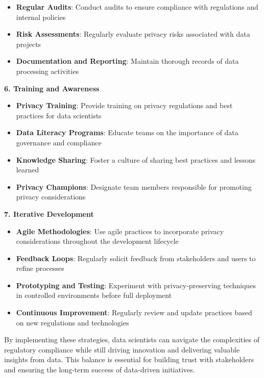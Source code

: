 \documentclass[12pt]{article}
\begin{document}
\begin{enumerate}
\begin{tcolorbox}[colback=blue!5!white,colframe=blue!75!black,title={Solution}]
\begin{itemize}
        \item \textbf{Regular Audits}: Conduct audits to ensure compliance with regulations and internal policies
        \item \textbf{Risk Assessments}: Regularly evaluate privacy risks associated with data projects
        \item \textbf{Documentation and Reporting}: Maintain thorough records of data processing activities
    \end{itemize}
    \textbf{6. Training and Awareness}
    \begin{itemize}
        \item \textbf{Privacy Training}: Provide training on privacy regulations and best practices for data scientists
        \item \textbf{Data Literacy Programs}: Educate teams on the importance of data governance and compliance
        \item \textbf{Knowledge Sharing}: Foster a culture of sharing best practices and lessons learned
        \item \textbf{Privacy Champions}: Designate team members responsible for promoting privacy considerations
    \end{itemize}
    \textbf{7. Iterative Development}
    \begin{itemize}
        \item \textbf{Agile Methodologies}: Use agile practices to incorporate privacy considerations throughout the development lifecycle
        \item \textbf{Feedback Loops}: Regularly solicit feedback from stakeholders and users to refine processes
        \item \textbf{Prototyping and Testing}: Experiment with privacy-preserving techniques in controlled environments before full deployment
        \item \textbf{Continuous Improvement}: Regularly review and update practices based on new regulations and technologies
    \end{itemize}
    By implementing these strategies, data scientists can navigate the complexities of regulatory compliance while still driving innovation and delivering valuable insights from data.
    This balance is essential for building trust with stakeholders and ensuring the long-term success of data-driven initiatives.
    \end{tcolorbox}
\end{enumerate}
\end{document}
